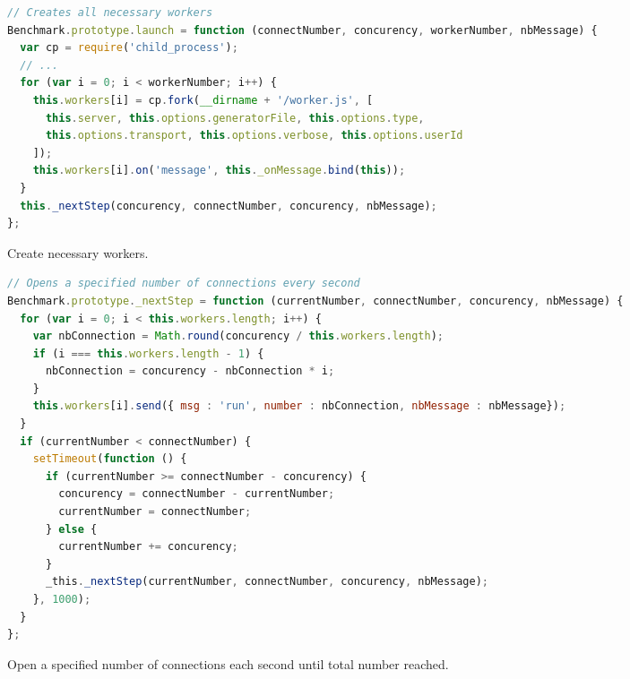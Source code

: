 \documentclass{uvamscse}
\begin{document}
\begin{sourcecode}[H]
\begin{lstlisting}[language=javascript]
// Creates all necessary workers
Benchmark.prototype.launch = function (connectNumber, concurency, workerNumber, nbMessage) {
  var cp = require('child_process');
  // ...
  for (var i = 0; i < workerNumber; i++) {
    this.workers[i] = cp.fork(__dirname + '/worker.js', [
      this.server, this.options.generatorFile, this.options.type,
      this.options.transport, this.options.verbose, this.options.userId
    ]);
    this.workers[i].on('message', this._onMessage.bind(this));
  }
  this._nextStep(concurency, connectNumber, concurency, nbMessage);
};
\end{lstlisting}
\caption{Create necessary workers.}
\label{lstlisting:loadtestexec}
\end{sourcecode}

\begin{sourcecode}[H]
\begin{lstlisting}[language=javascript]
// Opens a specified number of connections every second
Benchmark.prototype._nextStep = function (currentNumber, connectNumber, concurency, nbMessage) {
  for (var i = 0; i < this.workers.length; i++) {
    var nbConnection = Math.round(concurency / this.workers.length);
    if (i === this.workers.length - 1) {
      nbConnection = concurency - nbConnection * i;
    }
    this.workers[i].send({ msg : 'run', number : nbConnection, nbMessage : nbMessage});
  }
  if (currentNumber < connectNumber) {
    setTimeout(function () {
      if (currentNumber >= connectNumber - concurency) {
        concurency = connectNumber - currentNumber;
        currentNumber = connectNumber;
      } else {
        currentNumber += concurency;
      }
      _this._nextStep(currentNumber, connectNumber, concurency, nbMessage);
    }, 1000);
  }
};
\end{lstlisting}
\caption{Open a specified number of connections each second until total number reached.}
\label{lstlisting:loadtestexec2}
\end{sourcecode}
\end{document}
